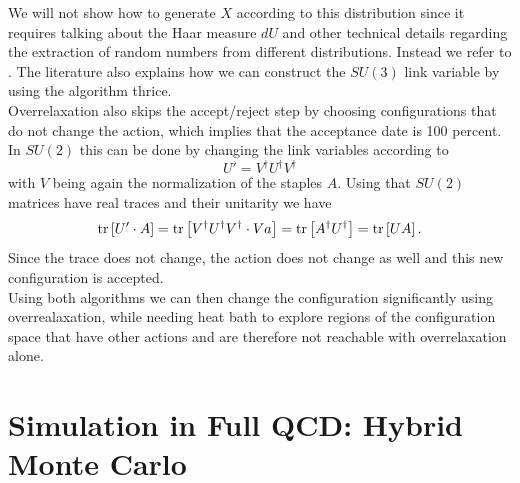 We will not show how to generate $X$ according to this distribution since it requires talking about the Haar measure $dU$ and other technical details regarding the extraction of random numbers from different distributions. Instead we refer to \cite{gattringer}. The literature also explains how we can construct the $SU(3)$ link variable by using the algorithm thrice.\\
Overrelaxation also skips the accept/reject step by choosing configurations that do not change the action, which implies that the acceptance date is 100 percent. In $SU(2)$ this can be done by changing the link variables according to
\begin{equation}
    U'=V^\dagger U^\dagger V^\dagger
\end{equation}
with $V$ being again the normalization of the staples $A$. Using that $SU(2)$ matrices have real traces and their unitarity we have
\begin{equation}
    \operatorname{tr}\left[U'\cdot A\right]=\operatorname{tr}\left[V^\dagger U^\dagger V^\dagger\cdot Va\right]=\operatorname{tr}\left[A^\dagger U^\dagger\right]=\operatorname{tr}\left[UA\right].
\end{equation}
Since the trace does not change, the action does not change as well and this new configuration is accepted.\\
Using both algorithms we can then change the configuration significantly using overrealaxation, while needing heat bath to explore regions of the configuration space that have other actions and are therefore not reachable with overrelaxation alone\cite{gattringer}. 
\section{Simulation in Full QCD: Hybrid Monte Carlo}

